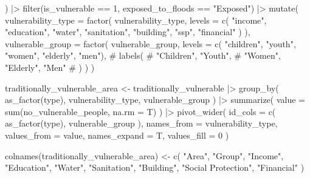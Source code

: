 \documentclass[
  letterpaper,
  DIV=11,
  numbers=noendperiod]{scrartcl}
\newenvironment{Shaded}{}{}
\newcommand{\AttributeTok}[1]{\textcolor[rgb]{0.84,0.23,0.29}{#1}}
\newcommand{\CommentTok}[1]{\textcolor[rgb]{0.42,0.45,0.49}{#1}}
\newcommand{\DecValTok}[1]{\textcolor[rgb]{0.00,0.36,0.77}{#1}}
\newcommand{\FunctionTok}[1]{\textcolor[rgb]{0.44,0.26,0.76}{#1}}
\newcommand{\NormalTok}[1]{\textcolor[rgb]{0.14,0.16,0.18}{#1}}
\newcommand{\OtherTok}[1]{\textcolor[rgb]{0.44,0.26,0.76}{#1}}
\newcommand{\SpecialCharTok}[1]{\textcolor[rgb]{0.00,0.36,0.77}{#1}}
\newcommand{\StringTok}[1]{\textcolor[rgb]{0.01,0.18,0.38}{#1}}
\begin{document}
\begin{Shaded}
\begin{Highlighting}[]
\NormalTok{  ) }\SpecialCharTok{|\textgreater{}}
  \FunctionTok{filter}\NormalTok{(is\_vulnerable }\SpecialCharTok{==} \DecValTok{1}\NormalTok{, exposed\_to\_floods }\SpecialCharTok{==} \StringTok{"Exposed"}\NormalTok{) }\SpecialCharTok{|\textgreater{}}
  \FunctionTok{mutate}\NormalTok{(}
    \AttributeTok{vulnerability\_type =} \FunctionTok{factor}\NormalTok{(}
\NormalTok{      vulnerability\_type,}
      \AttributeTok{levels =} \FunctionTok{c}\NormalTok{(}
        \StringTok{"income"}\NormalTok{,}
        \StringTok{"education"}\NormalTok{,}
        \StringTok{"water"}\NormalTok{,}
        \StringTok{"sanitation"}\NormalTok{,}
        \StringTok{"building"}\NormalTok{,}
        \StringTok{"ssp"}\NormalTok{,}
        \StringTok{"financial"}
\NormalTok{      )}
\NormalTok{    ),}
    \AttributeTok{vulnerable\_group =} \FunctionTok{factor}\NormalTok{(}
\NormalTok{      vulnerable\_group,}
      \AttributeTok{levels =} \FunctionTok{c}\NormalTok{(}
        \StringTok{"children"}\NormalTok{, }\StringTok{"youth"}\NormalTok{, }
        \StringTok{"women"}\NormalTok{, }\StringTok{"elderly"}\NormalTok{, }\StringTok{"men"}\NormalTok{),}
      \CommentTok{\# labels(}
      \CommentTok{\#   "Children", "Youth", }
      \CommentTok{\#   "Women", "Elderly", "Men"}
      \CommentTok{\# )}
\NormalTok{    )}
\NormalTok{  )}

\NormalTok{traditionally\_vulnerable\_area }\OtherTok{\textless{}{-}}\NormalTok{ traditionally\_vulnerable }\SpecialCharTok{|\textgreater{}} 
  \FunctionTok{group\_by}\NormalTok{(}
    \FunctionTok{as\_factor}\NormalTok{(type),}
\NormalTok{    vulnerability\_type,}
\NormalTok{    vulnerable\_group}
\NormalTok{  ) }\SpecialCharTok{|\textgreater{}} 
  \FunctionTok{summarize}\NormalTok{(}
    \AttributeTok{value =} \FunctionTok{sum}\NormalTok{(no\_vulnerable\_people, }\AttributeTok{na.rm =}\NormalTok{ T)}
\NormalTok{  ) }\SpecialCharTok{|\textgreater{}} 
  \FunctionTok{pivot\_wider}\NormalTok{(}
    \AttributeTok{id\_cols =} \FunctionTok{c}\NormalTok{(}
      \StringTok{\textasciigrave{}}\AttributeTok{as\_factor(type)}\StringTok{\textasciigrave{}}\NormalTok{,}
\NormalTok{      vulnerable\_group}
\NormalTok{    ),}
    \AttributeTok{names\_from =}\NormalTok{ vulnerability\_type,}
    \AttributeTok{values\_from =}\NormalTok{ value,}
    \AttributeTok{names\_expand =}\NormalTok{ T,}
    \AttributeTok{values\_fill =} \DecValTok{0}
\NormalTok{  ) }

\FunctionTok{colnames}\NormalTok{(traditionally\_vulnerable\_area) }\OtherTok{\textless{}{-}} \FunctionTok{c}\NormalTok{(}
  \StringTok{"Area"}\NormalTok{, }\StringTok{"Group"}\NormalTok{, }\StringTok{"Income"}\NormalTok{,}
  \StringTok{"Education"}\NormalTok{, }\StringTok{"Water"}\NormalTok{, }\StringTok{"Sanitation"}\NormalTok{,}
  \StringTok{"Building"}\NormalTok{, }\StringTok{"Social Protection"}\NormalTok{, }\StringTok{"Financial"}
\NormalTok{)}


\end{Highlighting}
\end{Shaded}
\end{document}
